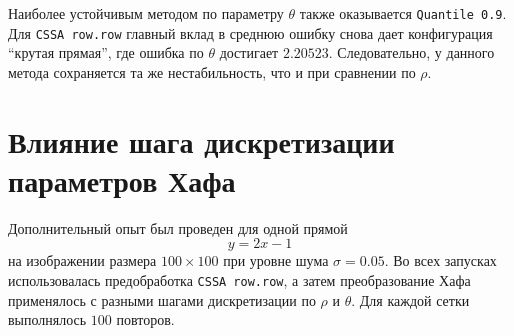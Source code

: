 \begin{table}[H]
	\centering
	\caption{Средние ошибки оценивания параметра $\theta$ по конфигурациям прямой}
	\label{tab:chapter3-theta-config}
\end{table}

Наиболее устойчивым методом по параметру $\theta$ также оказывается
\texttt{Quantile 0.9}. Для \texttt{CSSA row.row} главный вклад в среднюю
ошибку снова дает конфигурация ``крутая прямая'', где ошибка по $\theta$
достигает $2.20523$. Следовательно, у данного метода сохраняется та же нестабильность, что и при сравнении по $\rho$.

\section{Влияние шага дискретизации параметров Хафа}

Дополнительный опыт был проведен для одной прямой
\[
y = 2x - 1
\]
на изображении размера $100\times100$ при уровне шума $\sigma=0.05$. Во всех
запусках использовалась предобработка \texttt{CSSA row.row}, а затем
преобразование Хафа применялось с разными шагами дискретизации по $\rho$ и
$\theta$. Для каждой сетки выполнялось $100$ повторов.

\begin{table}[H]
	\centering
	\caption{Влияние шага дискретизации параметров Хафа на точность оценивания после \texttt{CSSA row.row}}
	\label{tab:chapter3-discretization-step}
	\resizebox{\textwidth}{!}{
	
	}
\end{table}

